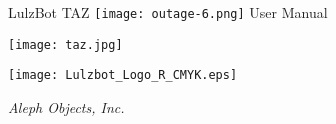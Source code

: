 %
%
%
%
%

\date {}
\thispagestyle{empty}
\begingroup
\centering 

\begin{center}
\fontsize{24pt}{1em}\selectfont LulzBot TAZ
\texttt{[image: outage-6.png]}
\fontsize{24pt}{1em}\selectfont User Manual
\end{center}

\par


\texttt{[image: taz.jpg]}

\begin{center}
\texttt{[image: Lulzbot\_Logo\_R\_CMYK.eps]}

{\large \itshape Aleph Objects, Inc.}
\end{center}
\endgroup
